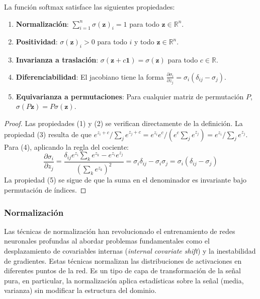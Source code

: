 \begin{proposition}\label{prop:softmax_propiedades}
La función softmax satisface las siguientes propiedades:
\begin{enumerate}
	\item \textbf{Normalización}: $\sum_{i=1}^n \sigma(\mathbf{z})_i = 1$ para todo $\mathbf{z} \in \mathbb{R}^n$.
	\item \textbf{Positividad}: $\sigma(\mathbf{z})_i > 0$ para todo $i$ y todo $\mathbf{z} \in \mathbb{R}^n$.
	\item \textbf{Invarianza a traslación}: $\sigma(\mathbf{z} + c\mathbf{1}) = \sigma(\mathbf{z})$ para todo $c \in \mathbb{R}$.
	\item \textbf{Diferenciabilidad}: El jacobiano tiene la forma $\frac{\partial \sigma_i}{\partial z_j} = \sigma_i(\delta_{ij} - \sigma_j)$.
	\item \textbf{Equivarianza a permutaciones}: Para cualquier matriz de permutación $P$, $\sigma(P\mathbf{z}) = P\sigma(\mathbf{z})$.
\end{enumerate}
\end{proposition}

\begin{proof}
Las propiedades (1) y (2) se verifican directamente de la definición. La propiedad (3) resulta de que $e^{z_i + c}/\sum_j e^{z_j + c} = e^{z_i}e^c/(e^c\sum_j e^{z_j}) = e^{z_i}/\sum_j e^{z_j}$. Para (4), aplicando la regla del cociente:
\[
\frac{\partial \sigma_i}{\partial z_j} = \frac{\delta_{ij}e^{z_i}\sum_k e^{z_k} - e^{z_i}e^{z_j}}{(\sum_k e^{z_k})^2} = \sigma_i\delta_{ij} - \sigma_i\sigma_j = \sigma_i(\delta_{ij} - \sigma_j)
\]
La propiedad (5) se sigue de que la suma en el denominador es invariante bajo permutación de índices.
\end{proof}

\subsubsection{Normalización}

Las técnicas de normalización han revolucionado el entrenamiento de redes neuronales profundas al abordar problemas fundamentales como el desplazamiento de covariables internas (\textit{internal covariate shift}) y la inestabilidad de gradientes. Estas técnicas normalizan las distribuciones de activaciones en diferentes puntos de la red. Es un tipo de capa de transformación de la señal pura, en particular, la normalización aplica estadísticas sobre la señal (media, varianza) sin modificar la estructura del dominio.

